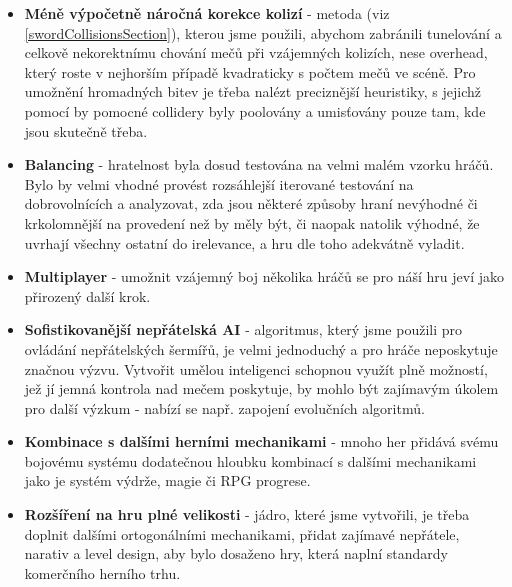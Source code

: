 \begin{itemize}
    \item \textbf{Méně výpočetně náročná korekce kolizí} - metoda (viz \ref{swordCollisionsSection}), kterou jsme použili, abychom zabránili tunelování a celkově nekorektnímu chování mečů při vzájemných kolizích, nese overhead, který roste v nejhorším případě kvadraticky s počtem mečů ve scéně. Pro umožnění hromadných bitev je třeba nalézt preciznější heuristiky, s jejichž pomocí by pomocné collidery byly poolovány a umisťovány pouze tam, kde jsou skutečně třeba.
    \item \textbf{Balancing} - hratelnost byla dosud testována na velmi malém vzorku hráčů. Bylo by velmi vhodné provést rozsáhlejší iterované testování na dobrovolnících a analyzovat, zda jsou některé způsoby hraní nevýhodné či krkolomnější na provedení než by měly být, či naopak natolik výhodné, že uvrhají všechny ostatní do irelevance, a hru dle toho adekvátně vyladit.
    \item \textbf{Multiplayer} - umožnit vzájemný boj několika hráčů se pro náší hru jeví jako přirozený další krok. 
    \item \textbf{Sofistikovanější nepřátelská AI} - algoritmus, který jsme použili pro ovládání nepřátelských šermířů, je velmi jednoduchý a pro hráče neposkytuje značnou výzvu. Vytvořit umělou inteligenci schopnou využít plně možností, jež jí jemná kontrola nad mečem poskytuje, by mohlo být zajímavým úkolem pro další výzkum - nabízí se např. zapojení evolučních algoritmů.
    \item \textbf{Kombinace s dalšími herními mechanikami} - mnoho her přidává svému bojovému systému dodatečnou hloubku kombinací s dalšími mechanikami jako je systém výdrže, magie či \acs{RPG} progrese.
    \item \textbf{Rozšíření na hru plné velikosti} - jádro, které jsme vytvořili, je třeba doplnit dalšími ortogonálními mechanikami, přidat zajímavé nepřátele, narativ a level design, aby bylo dosaženo hry, která naplní standardy komerčního herního trhu. 
\end{itemize}

\nocite{ThisGithubRepo}